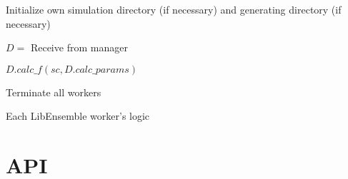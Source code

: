 \documentclass{article}
\begin{document}
\newpage
\LinesNumbered
\begin{algorithm}[t] %

  Initialize own simulation directory (if necessary) and generating directory (if necessary)\\
  \While{\true}
  {
    $D =$ Receive from manager \\ 


    $D.calc\_f(sc, D.calc\_params)$
    
  }
  Terminate all workers
  \caption{Each LibEnsemble worker's logic \label{alg:manager}} 
\end{algorithm}

\section{API}
\end{document}
